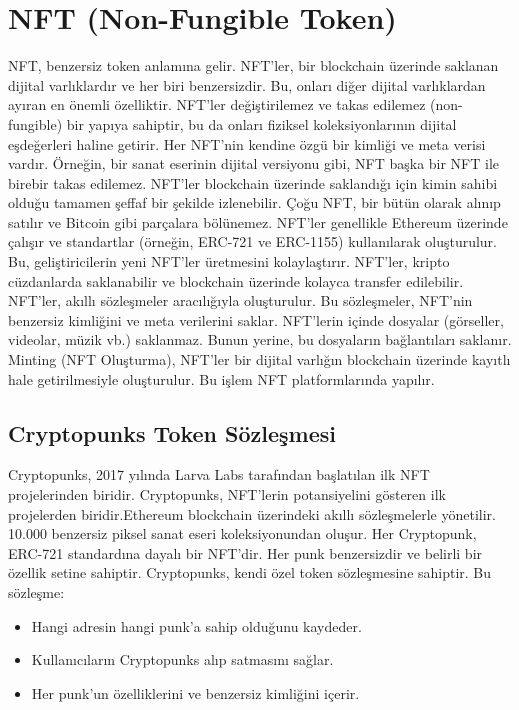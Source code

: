 \section{NFT (Non-Fungible Token)}

NFT, benzersiz token anlamına gelir. NFT'ler, bir blockchain üzerinde saklanan dijital varlıklardır ve her biri benzersizdir. Bu, onları diğer dijital varlıklardan ayıran en önemli özelliktir. NFT'ler değiştirilemez ve takas edilemez (non-fungible) bir yapıya sahiptir, bu da onları fiziksel koleksiyonlarının dijital eşdeğerleri haline getirir. Her NFT'nin kendine özgü bir kimliği ve meta verisi vardır. Örneğin, bir sanat eserinin dijital versiyonu gibi, NFT başka bir NFT ile birebir takas edilemez. NFT'ler blockchain üzerinde saklandığı için kimin sahibi olduğu tamamen şeffaf bir şekilde izlenebilir. Çoğu NFT, bir bütün olarak alınıp satılır ve Bitcoin gibi parçalara bölünemez. NFT'ler genellikle Ethereum üzerinde çalışır ve standartlar (örneğin, ERC-721 ve ERC-1155) kullanılarak oluşturulur. Bu, geliştiricilerin yeni NFT'ler üretmesini kolaylaştırır. NFT'ler, kripto cüzdanlarda saklanabilir ve blockchain üzerinde kolayca transfer edilebilir. NFT'ler, akıllı sözleşmeler aracılığıyla oluşturulur. Bu sözleşmeler, NFT'nin benzersiz kimliğini ve meta verilerini saklar. NFT'lerin içinde dosyalar (görseller, videolar, müzik vb.) saklanmaz. Bunun yerine, bu dosyaların bağlantıları saklanır. Minting (NFT Oluşturma), NFT'ler bir dijital varlığın blockchain üzerinde kayıtlı hale getirilmesiyle oluşturulur. Bu işlem NFT platformlarında yapılır.

\subsection{Cryptopunks Token Sözleşmesi}

Cryptopunks, 2017 yılında Larva Labs tarafından başlatılan ilk NFT projelerinden biridir. Cryptopunks, NFT'lerin potansiyelini gösteren ilk projelerden biridir.Ethereum blockchain üzerindeki akıllı sözleşmelerle yönetilir. 10.000 benzersiz piksel sanat eseri koleksiyonundan oluşur. Her Cryptopunk, ERC-721 standardına dayalı bir NFT'dir. Her punk benzersizdir ve belirli bir özellik setine sahiptir. Cryptopunks, kendi özel token sözleşmesine sahiptir. Bu sözleşme:

\begin{itemize}
    \item Hangi adresin hangi punk'a sahip olduğunu kaydeder.
    \item Kullanıcıların Cryptopunks alıp satmasını sağlar.
    \item Her punk'un özelliklerini ve benzersiz kimliğini içerir.
\end{itemize}

